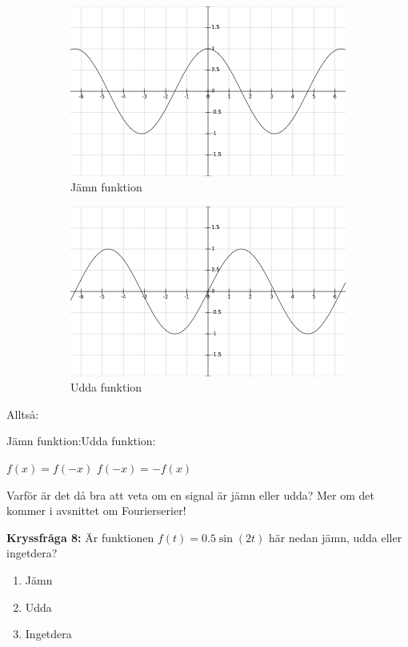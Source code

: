 \documentclass{article}
\begin{document}
\begin{figure}[ht]
\centering
\begin{subfigure}{0.50\textwidth}
  \centering
  \includegraphics[width=0.90\linewidth]{image09.png}
  \caption{Jämn funktion}
  \label{}
\end{subfigure}%
\begin{subfigure}{0.50\textwidth}
  \centering
  \includegraphics[width=0.90\linewidth]{image14.png}
  \caption{Udda funktion}
 \label{}
\end{subfigure}%
\caption{}
\label{}
\end{figure}



Alltså:

Jämn funktion:\hfill Udda funktion:

$ f(x)=f(-x)$ \hfill $f(-x)=-f(x) $

Varför är det då bra att veta om en signal är jämn eller udda?
Mer om det kommer i avsnittet om Fourierserier!

\newpage

\textbf{Kryssfråga 8:} Är funktionen $f(t)=0.5\sin(2t)$ här nedan jämn,
udda eller ingetdera?
\begin{enumerate}[label={\alph*)},font={\bfseries}]
    \item Jämn
    \item Udda
    \item Ingetdera
\end{enumerate}
\end{document}

